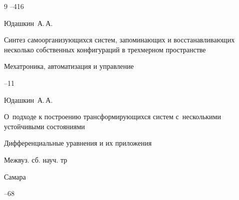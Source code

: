 \begin{thebibliography}{9}
--416





\by Юдашкин~А.\,А.

\paper Синтез самоорганизующихся систем, запоминающих и восстанавливающих несколько собственных конфигураций в трехмерном пространстве

\jour Мехатроника, автоматизация и управление



--11




\by Юдашкин~А.\,А.

\paper О~подходе к построению трансформирующихся систем с~несколькими устойчивыми состояниями

\inbook Дифференциальные уравнения и их приложения

\bookinfo Межвуз. сб. науч. тр

\publaddr Самара



--68





\end{thebibliography}







\makeengtitlem







% 







